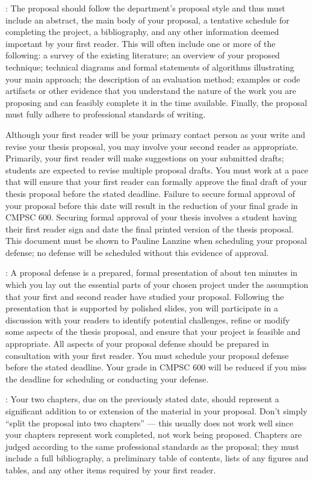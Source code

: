 : The proposal should follow the department's proposal style and thus must include an
abstract, the main body of your proposal, a tentative schedule for completing the project, a bibliography, and any other
information deemed important by your first reader. This will often include one or more of the following: a survey of the
existing literature; an overview of your proposed technique; technical diagrams and formal statements of algorithms
illustrating your main approach; the description of an evaluation method; examples or code artifacts or other evidence that
you understand the nature of the work you are proposing and can feasibly complete it in the time available.  Finally, the
proposal must fully adhere to professional standards of writing.

Although your first reader will be your primary contact person as your write and revise your thesis proposal, you may
involve your second reader as appropriate. Primarily, your first reader will make suggestions on your submitted drafts;
students are expected to revise multiple proposal drafts.  You must work at a pace that will ensure that your first
reader can formally approve the final draft of your thesis proposal before the stated deadline. Failure to secure formal
approval of your proposal before this date will result in the reduction of your final grade in CMPSC 600.  Securing
formal approval of your thesis involves a student having their first reader sign and date the final printed version of
the thesis proposal. This document must be shown to Pauline Lanzine when scheduling your proposal defense; no defense
will be scheduled without this evidence of approval.

: A proposal defense is a prepared, formal presentation of about ten minutes in which you
lay out the essential parts of your chosen project under the assumption that your first and second reader have studied
your proposal.  Following the presentation that is supported by polished slides, you will participate in a discussion
with your readers to identify potential challenges, refine or modify some aspects of the thesis proposal, and ensure that
your project is feasible and appropriate. All aspects of your proposal defense should be prepared in consultation with
your first reader.  You must schedule your proposal defense before the stated deadline. Your grade in CMPSC 600 will be
reduced if you miss the deadline for scheduling or conducting your defense.

: Your two chapters, due on the previously stated date, should represent a significant
addition to or extension of the material in your proposal. Don't simply ``split the proposal into two chapters'' ---
this usually does not work well since your chapters represent work completed, not work being proposed.  Chapters are
judged according to the same professional standards as the proposal; they must include a full bibliography, a
preliminary table of contents, lists of any figures and tables, and any other items required by your first reader.

